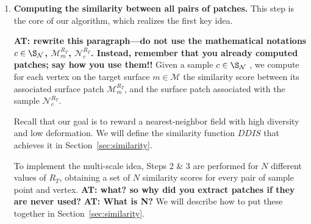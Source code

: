 \documentclass[10pt,twocolumn,letterpaper]{article}
\newcommand{\colornote}[3]{{\color{#1}\bf{#2: #3}\normalfont}}
\newcommand{\colornote}[3]{}
\newcommand {\ayellet}[1]{\colornote{blue}{AT}{#1}}
\newcommand {\nadav}[1]{\colornote{red}{NA}{#1}}
\begin{document}
\begin{enumerate}
    Once the set of representing sample set is defined, a disc (sub-surface) of geodesic distance $R_T$ is extracted around each sample point, which is the sought-after set of patches.
    Specifically, $R_T=\beta\cdot R_\mathcal{M}$ and $\beta$ is a hyper parameter tuned on a training set. \ayellet{What is $R_M$? How exactly do we get $beta$?}
    
    \item
    {\bf Computing the similarity between all pairs of patches.} 
    This step is the core of our algorithm, which realizes the first key idea.
    
    \ayellet{rewrite this paragraph---do not use the mathematical notations $c\in\S_\mathcal{N}$, ${\mathcal{M}^{R_T}_{m}}$, ${\mathcal{N}^{R_T}_{c}}$.
    Instead, remember that you already computed patches; say how you use them!!}
    Given a sample $c\in\S_\mathcal{N}$ , we compute for each vertex on the target surface $m\in\mathcal{M}$  the similarity score between its associated surface patch ${\mathcal{M}^{R_T}_{m}}$, and the surface patch associated with the sample ${\mathcal{N}^{R_T}_{c}}$.

    Recall that our goal is to reward a nearest-neighbor field with high diversity and low deformation. 
    We will define the similarity function $DDIS$ that achieves it  in Section~\ref{sec:similarity}.
    
    To implement the multi-scale idea, Steps 2 \& 3 are performed for $N$ different values of $R_T$, obtaining a set of $N$ similarity scores for every pair of sample point and vertex.
    \ayellet{what? so why did you extract patches if they are never used?}
    \ayellet{What is N?}
    We will describe how to put these together in Section~\ref{sec:similarity}.

    

\end{enumerate}
\end{document}
